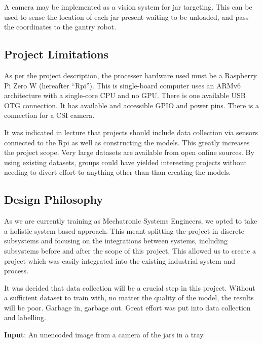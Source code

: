 \documentclass[11pt]{article}
\begin{document}
            A camera may be implemented as a vision system for jar targeting. This can be used to sense the location of each jar present waiting to be unloaded, and pass the coordinates to the gantry robot.

        \subsection{Project Limitations}\label{sec:proj-limits}
            As per the project description, the processer hardware used must be a Raspberry Pi Zero W (hereafter ``Rpi''). This is single-board computer uses an ARMv6 architecture with a single-core CPU and no GPU. There is one available USB OTG connection. It has available and accessible GPIO and power pins. There is a connection for a CSI camera\cite{rpi}. 

            It was indicated in lecture that projects should include data collection via sensors connected to the Rpi as well as constructing the models. This greatly increases the project scope. Very large datasets are available  from open online sources. By using existing datasets, groups could have yielded interesting projects without needing to divert effort to anything other than than creating the models.
            

        \subsection{Design Philosophy}
            As we are currently training as Mechatronic Systems Engineers, we opted to take a holistic system based approach. This meant splitting the project in discrete subsystems and focusing on the integrations between systems, including subsystems before and after the scope of this project. This allowed us to create a project which was easily integrated into the existing industrial system and process. 

            It was decided that data collection will be a crucial step in this project. Without a sufficient dataset to train with, no matter the quality of the model, the results will be poor. Garbage in, garbage out. Great effort was put into data collection and labelling.

            \textbf{Input}: An unencoded image from a camera of the jars in a tray.
\end{document}

